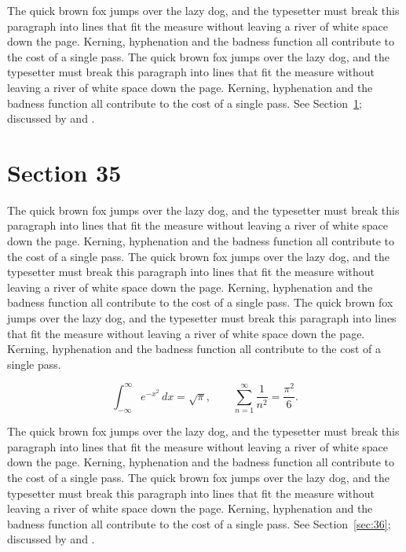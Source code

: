\documentclass{article}
\begin{document}
The quick brown fox jumps over the lazy dog, and the typesetter must break this paragraph into lines that fit the measure without leaving a river of white space down the page. Kerning, hyphenation and the badness function all contribute to the cost of a single pass. The quick brown fox jumps over the lazy dog, and the typesetter must break this paragraph into lines that fit the measure without leaving a river of white space down the page. Kerning, hyphenation and the badness function all contribute to the cost of a single pass. 
See Section~\ref{sec:35}; discussed by \textcite{k5} and \textcite{l2}.
\section{Section 35}
\label{sec:35}
The quick brown fox jumps over the lazy dog, and the typesetter must break this paragraph into lines that fit the measure without leaving a river of white space down the page. Kerning, hyphenation and the badness function all contribute to the cost of a single pass. The quick brown fox jumps over the lazy dog, and the typesetter must break this paragraph into lines that fit the measure without leaving a river of white space down the page. Kerning, hyphenation and the badness function all contribute to the cost of a single pass. The quick brown fox jumps over the lazy dog, and the typesetter must break this paragraph into lines that fit the measure without leaving a river of white space down the page. Kerning, hyphenation and the badness function all contribute to the cost of a single pass. 

\begin{equation}\label{eq:35}
\int_{-\infty}^{\infty} e^{-x^{2}}\,dx = \sqrt{\pi}, \qquad
\sum_{n=1}^{\infty} \frac{1}{n^{2}} = \frac{\pi^{2}}{6}.
\end{equation}

The quick brown fox jumps over the lazy dog, and the typesetter must break this paragraph into lines that fit the measure without leaving a river of white space down the page. Kerning, hyphenation and the badness function all contribute to the cost of a single pass. The quick brown fox jumps over the lazy dog, and the typesetter must break this paragraph into lines that fit the measure without leaving a river of white space down the page. Kerning, hyphenation and the badness function all contribute to the cost of a single pass. 
See Section~\ref{sec:36}; discussed by \textcite{k1} and \textcite{l3}.
\end{document}
